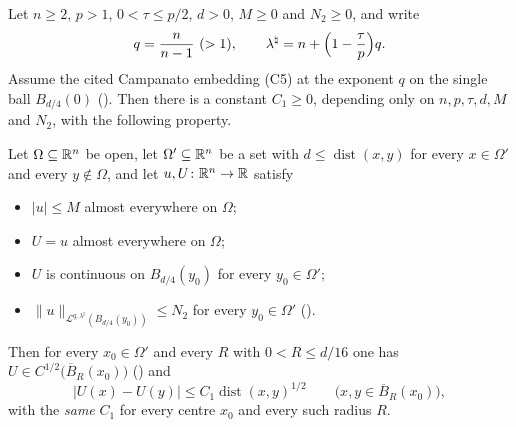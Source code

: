 \begin{lemma}
Let $n\ge2$, $p>1$, $0<\tau\le p/2$, $d>0$, $M\ge0$ and $N_2\ge0$, and write
\[
q=\frac n{n-1}\ (>1),\qquad
\lambda^\natural=n+\Bigl(1-\frac\tau p\Bigr)q .
\]
Assume the cited Campanato embedding (C5) at the exponent $q$ on the single ball
$B_{d/4}(0)$ ().  Then there is a constant
$C_1\ge0$, depending only on $n,p,\tau,d,M$ and $N_2$, with the following
property.

Let $\Omega\subseteq\mathbb{R}^n$ be open, let $\Omega'\subseteq\mathbb{R}^n$ be a set with
$d\le\operatorname{dist}(x,y)$ for every $x\in\Omega'$ and every
$y\notin\Omega$, and let $u,U\colon\mathbb{R}^n\to\mathbb{R}$ satisfy
\begin{itemize}
\item[(a)] $|u|\le M$ almost everywhere on $\Omega$;
\item[(b)] $U=u$ almost everywhere on $\Omega$;
\item[(c)] $U$ is continuous on $B_{d/4}(y_0)$ for every $y_0\in\Omega'$;
\item[(d)] $\|u\|_{\mathcal L^{q,\lambda^\natural}(B_{d/4}(y_0))}\le N_2$ for
  every $y_0\in\Omega'$ ().
\end{itemize}
Then for every $x_0\in\Omega'$ and every $R$ with $0<R\le d/16$ one has
$U\in C^{1/2}\bigl(\overline B_R(x_0)\bigr)$ () and
\[
|U(x)-U(y)|\le C_1\operatorname{dist}(x,y)^{1/2}
\qquad\bigl(x,y\in\overline B_R(x_0)\bigr),
\]
with the \emph{same} $C_1$ for every centre $x_0$ and every such radius $R$.
\end{lemma}

